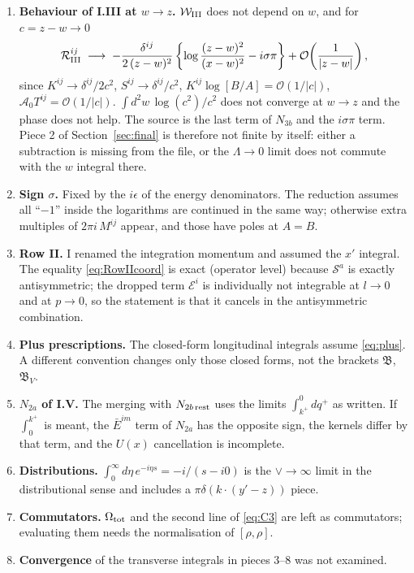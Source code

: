 \documentclass[10pt]{article}
\numberwithin{equation}{section}
\begin{document}
\begin{enumerate}
\item \textbf{Behaviour of I.III at $w\to z$.} $\mathcal{W}_{\rm III}$ does not depend on $w$, and for $c=z-w\to0$
\begin{align}
\mathcal{R}_{\rm III}^{ij}\;\longrightarrow\;-\frac{\delta^{ij}}{2\,(z-w)^{2}}\left\{\log\frac{(z-w)^{2}}{(x-w)^{2}}-i\sigma\pi\right\}+\mathcal{O}\!\left(\frac{1}{|z-w|}\right),
\end{align}
since $K^{ij}\to\delta^{ij}/2c^{2}$, $S^{ij}\to\delta^{ij}/c^{2}$, $K^{ij}\log[B/A]=\mathcal{O}(1/|c|)$, $\mathcal{A}_{0}T^{ij}=\mathcal{O}(1/|c|)$. $\int d^{2}w\,\log(c^{2})/c^{2}$ does not converge at $w\to z$ and the phase does not help. The source is the last term of $N_{3b}$ and the $i\sigma\pi$ term. Piece 2 of Section~\ref{sec:final} is therefore not finite by itself: either a subtraction is missing from the file, or the $\Lambda\to0$ limit does not commute with the $w$ integral there.
\item \textbf{Sign $\sigma$.} Fixed by the $i\epsilon$ of the energy denominators. The reduction assumes all ``$-1$'' inside the logarithms are continued in the same way; otherwise extra multiples of $2\pi i\,M^{ij}$ appear, and those have poles at $A=B$.
\item \textbf{Row II.} I renamed the integration momentum and assumed the $x'$ integral. The equality \eqref{eq:RowIIcoord} is exact (operator level) because $\mathcal{S}^{a}$ is exactly antisymmetric; the dropped term $\mathcal{E}^{i}$ is individually not integrable at $l\to0$ and at $p\to0$, so the statement is that it cancels in the antisymmetric combination.
\item \textbf{Plus prescriptions.} The closed-form longitudinal integrals assume \eqref{eq:plus}. A different convention changes only those closed forms, not the brackets $\mathfrak{B}$, $\mathfrak{B}_{V}$.
\item \textbf{$N_{2a}$ of I.V.} The merging with $N_{2b\,\rm rest}$ uses the limits $\int^{0}_{k^{+}}dq^{+}$ as written. If $\int_{0}^{k^{+}}$ is meant, the $\bar E^{im}$ term of $N_{2a}$ has the opposite sign, the kernels differ by that term, and the $U(x)$ cancellation is incomplete.
\item \textbf{Distributions.} $\int_{0}^{\infty}d\eta\,e^{-i\eta s}=-i/(s-i0)$ is the $\vee\to\infty$ limit in the distributional sense and includes a $\pi\delta(k\cdot(y'-z))$ piece.
\item \textbf{Commutators.} $\Omega_{\rm tot}$ and the second line of \eqref{eq:C3} are left as commutators; evaluating them needs the normalisation of $[\rho,\rho]$.
\item \textbf{Convergence} of the transverse integrals in pieces 3--8 was not examined.
\end{enumerate}
\end{document}

